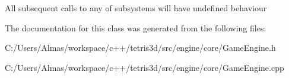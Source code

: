 All subsequent calls to any of subsystems will have undefined behaviour 

The documentation for this class was generated from the following files\-:\begin{DoxyCompactItemize}
\item 
C\-:/\-Users/\-Almas/workspace/c++/tetris3d/src/engine/core/Game\-Engine.\-h\item 
C\-:/\-Users/\-Almas/workspace/c++/tetris3d/src/engine/core/Game\-Engine.\-cpp\end{DoxyCompactItemize}
